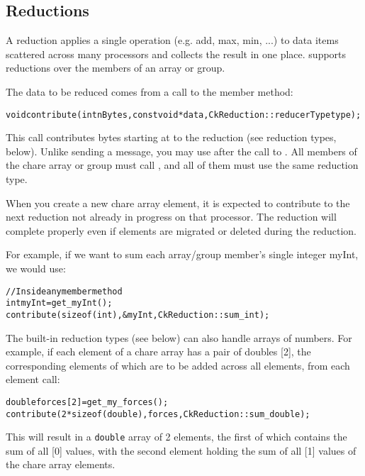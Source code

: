 \subsection{Reductions}

\label{reductions}

A reduction applies a single operation (e.g. add,
max, min, ...) to data items scattered across many processors and
collects the result in one place.  \charmpp{} supports reductions
over the members of an array or group.

The data to be reduced comes from a call to the member  
method:
\begin{alltt}
void contribute(int nBytes,const void *data,CkReduction::reducerType type);
\end{alltt}

This call contributes  bytes starting at  to the
reduction  (see reduction types, below).  Unlike sending a
message, you may use  after the call to .  All
members of the chare array or group must call , and all of them must use the same
reduction type.  

When you create a new chare array element, it is expected
to contribute to the next reduction not already in progress on that
processor.  The
reduction will complete properly even if elements are migrated
or deleted during the reduction. 

For example, if we want to sum each array/group member's single integer myInt, 
we would use:

\begin{alltt}
    // Inside any member method
    int myInt=get_myInt();
    contribute(sizeof(int),\&myInt,CkReduction::sum_int);
\end{alltt}

The built-in reduction types (see below) can also handle arrays of
numbers.  For example, if each element of a chare array has a pair of
doubles [2], the corresponding elements of which are to be added across
all elements, from each element call:

\begin{alltt}
    double forces[2]=get_my_forces();
    contribute(2*sizeof(double),forces,CkReduction::sum_double);
\end{alltt}

This will result in a {\tt double} array of 2 elements, the first of which
contains the sum of all [0] values, with the second element 
holding the sum of all [1] values of the chare array elements.

